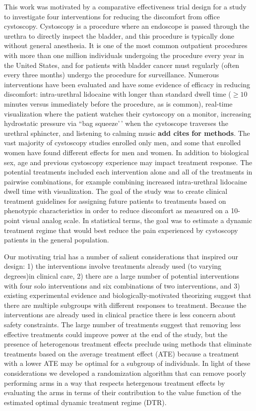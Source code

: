 \documentclass[12pt,,letterpaper,twoside]{report}
\begin{document}
This work was motivated by a comparative effectiveness trial design for
a study to investigate four interventions for reducing the discomfort
from office cystoscopy. Cystoscopy is a procedure where an endoscope is
passed through the urethra to directly inspect the bladder, and this
procedure is typically done without general anesthesia. It is one of the
most common outpatient procedures with more than one million individuals
undergoing the procedure every year in the United
States\cite{dartmouth_atlas_data_2021}, and for patients with bladder
cancer must regularly (often every three months) undergo the procedure
for surveillance. Numerous interventions have been evaluated and have
some evidence of efficacy in reducing discomfort: intra-urethral
lidocaine with longer than standard dwell time (\(\geq 10\) minutes
versus immediately before the procedure, as is common), real-time
visualization where the patient watches their cystoscopy on a monitor,
increasing hydrostatic pressure via ``bag squeeze'\,' when the
cystoscope traverses the urethral sphincter, and listening to calming
music \textbf{add cites for methods}. The vast majority of cystoscopy
studies enrolled only men, and some that enrolled women have found
different effects for men and women. In addition to biological sex, age
and previous cystoscopy experience may impact treatment response. The
potential treatments included each intervention alone and all of the
treatments in pairwise combinations, for example combining increased
intra-urethral lidocaine dwell time with visualization. The goal of the
study was to create clinical treatment guidelines for assigning future
patients to treatments based on phenotypic characteristics in order to
reduce discomfort as measured on a 10-point visual analog scale. In
statistical terms, the goal was to estimate a dynamic treatment regime
that would best reduce the pain experienced by cystoscopy patients in
the general population.

Our motivating trial has a number of salient considerations that
inspired our design: 1) the interventions involve treatments already
used (to varying degrees)in clinical care, 2) there are a large number
of potential interventions with four solo interventions and six
combinations of two interventions, and 3) existing experimental evidence
and biologically-motivated theorizing suggest that there are multiple
subgroups with different responses to treatment. Because the
interventions are already used in clinical practice there is less
concern about safety constraints. The large number of treatments suggest
that removing less effective treatments could improve power at the end
of the study, but the presence of heterogenous treatment effects
preclude using methods that eliminate treatments based on the average
treatment effect (ATE) because a treatment with a lower ATE may be
optimal for a subgroup of individuals. In light of these considerations
we developed a randomization algorithm that can remove poorly performing
arms in a way that respects hetergenous treatment effects by evaluating
the arms in terms of their contribution to the value function of the
estimated optimal dynamic treatment regime (DTR).
\end{document}
